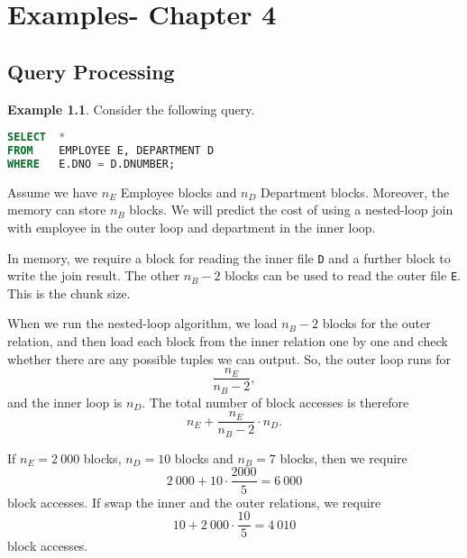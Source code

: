 \documentclass[a4paper, openany]{memoir}
\theoremstyle{definition}
\newtheorem{example}[subsection]{Example}
\begin{document}
\chapter{Examples- Chapter 4}
\section{Query Processing}
\begin{example}
    Consider the following query.
\begin{lstlisting}[language=SQL]
SELECT  *
FROM    EMPLOYEE E, DEPARTMENT D
WHERE   E.DNO = D.DNUMBER;
\end{lstlisting}
    Assume we have $n_E$ Employee blocks and $n_D$ Department blocks. Moreover, the memory can store $n_B$ blocks. We will predict the cost of using a nested-loop join with employee in the outer loop and department in the inner loop.    
\end{example}
\begin{answer}
    In memory, we require a block for reading the inner file \texttt{D} and a further block to write the join result. The other $n_B - 2$ blocks can be used to read the outer file \texttt{E}. This is the chunk size.

    When we run the nested-loop algorithm, we load $n_B - 2$ blocks for the outer relation, and then load each block from the inner relation one by one and check whether there are any possible tuples we can output. So, the outer loop runs for
    \[\frac{n_E}{n_B - 2},\]
    and the inner loop is $n_D$. The total number of block accesses is therefore
    \[n_E + \frac{n_E}{n_B - 2} \cdot n_D.\]

    If $n_E = 2 \ 000$ blocks, $n_D = 10$ blocks and $n_B = 7$ blocks, then we require 
    \[2 \ 000 + 10 \cdot \frac{2000}{5} = 6 \ 000\]
    block accesses. If swap the inner and the outer relations, we require
    \[10 + 2 \ 000 \cdot \frac{10}{5} = 4 \ 010\]
    block accesses.
\end{answer}
\newpage
\end{document}
